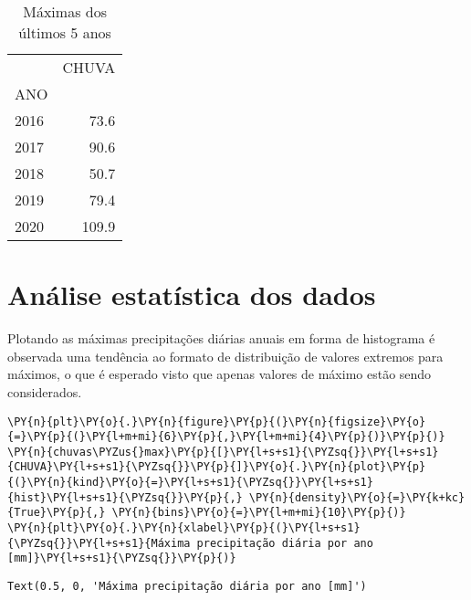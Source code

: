     
    \begin{table}[H]
    \centering
    \caption{Máximas dos últimos 5 anos}
    {\begin{tabular}{lr}
\toprule
{} &  CHUVA \\
ANO  &        \\
\midrule
2016 &   73.6 \\
2017 &   90.6 \\
2018 &   50.7 \\
2019 &   79.4 \\
2020 &  109.9 \\
\bottomrule
\end{tabular}
}
    \label{tab:ultmax}
    \end{table}
    

    
    \hypertarget{anuxe1lise-estatuxedstica-dos-dados}{%
\section{Análise estatística dos
dados}\label{anuxe1lise-estatuxedstica-dos-dados}}


Plotando as máximas precipitações diárias anuais em forma de histograma é observada uma tendência ao formato de distribuição de valores extremos para máximos, o que é esperado visto que apenas valores de máximo estão sendo considerados. 


    \begin{tcolorbox}[breakable, size=fbox, boxrule=1pt, pad at break*=1mm,colback=cellbackground, colframe=cellborder]
\begin{Verbatim}[commandchars=\\\{\}]
\PY{n}{plt}\PY{o}{.}\PY{n}{figure}\PY{p}{(}\PY{n}{figsize}\PY{o}{=}\PY{p}{(}\PY{l+m+mi}{6}\PY{p}{,}\PY{l+m+mi}{4}\PY{p}{)}\PY{p}{)}
\PY{n}{chuvas\PYZus{}max}\PY{p}{[}\PY{l+s+s1}{\PYZsq{}}\PY{l+s+s1}{CHUVA}\PY{l+s+s1}{\PYZsq{}}\PY{p}{]}\PY{o}{.}\PY{n}{plot}\PY{p}{(}\PY{n}{kind}\PY{o}{=}\PY{l+s+s1}{\PYZsq{}}\PY{l+s+s1}{hist}\PY{l+s+s1}{\PYZsq{}}\PY{p}{,} \PY{n}{density}\PY{o}{=}\PY{k+kc}{True}\PY{p}{,} \PY{n}{bins}\PY{o}{=}\PY{l+m+mi}{10}\PY{p}{)}
\PY{n}{plt}\PY{o}{.}\PY{n}{xlabel}\PY{p}{(}\PY{l+s+s1}{\PYZsq{}}\PY{l+s+s1}{Máxima precipitação diária por ano [mm]}\PY{l+s+s1}{\PYZsq{}}\PY{p}{)}
\end{Verbatim}
\end{tcolorbox}

            \begin{tcolorbox}[breakable, size=fbox, boxrule=.5pt, pad at break*=1mm, opacityfill=0]
\begin{Verbatim}[commandchars=\\\{\}]
Text(0.5, 0, 'Máxima precipitação diária por ano [mm]')
\end{Verbatim}
\end{tcolorbox}
        
